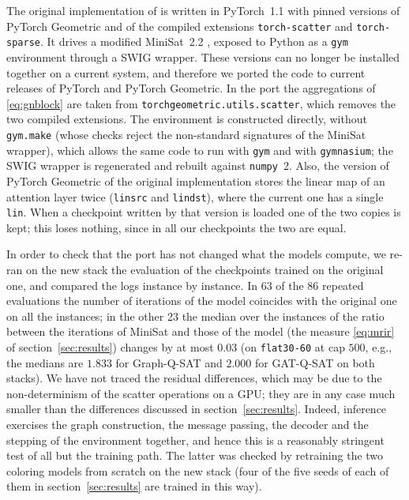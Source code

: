 \documentclass[11pt,a4paper]{article}
\newcommand{\code}[1]{\texttt{\def\_{\textunderscore\allowbreak}#1}}
\begin{document}
The original implementation of \cite{Kurin2020} is written in PyTorch~1.1 with pinned
versions of PyTorch Geometric \cite{FeyLenssen2019} and of the compiled
extensions \code{torch-scatter} and \code{torch-sparse}. It drives a modified
MiniSat~2.2 \cite{EenSorensson2003}, exposed to Python as a \code{gym}
environment through a SWIG wrapper. These versions can no longer be installed
together on a current system, and therefore we ported the code to current
releases of PyTorch and PyTorch Geometric. In the port the aggregations of
\eqref{eq:gnblock} are taken from \code{torch\_geometric.utils.scatter}, which
removes the two compiled extensions. The environment is constructed
directly, without \code{gym.make} (whose checks reject the non-standard
signatures of the MiniSat wrapper), which allows the same code to run with
\code{gym} and with \code{gymnasium}; the SWIG wrapper is regenerated and
rebuilt against \code{numpy}~2. Also, the version of PyTorch Geometric of the original implementation
stores the linear map of an attention layer twice (\code{lin\_src} and
\code{lin\_dst}), where the current one has a single \code{lin}. When a
checkpoint written by that version is loaded one of the two copies is kept; this loses nothing,
since in all our checkpoints the two are equal.

\smallskip
\noindent
In order to check that the port has not changed what the models compute, we
re-ran on the new stack the evaluation of the checkpoints trained on the original one, and compared the logs instance by instance. In 63 of the 86
repeated evaluations the number of iterations of the model coincides with the original one on all the instances; in the other 23 the median over the instances
of the ratio between the iterations of MiniSat and those of the model (the
measure \eqref{eq:mrir} of section~\ref{sec:results}) changes by at most $0.03$
(on \code{flat30-60} at cap $500$,
e.g., the medians are $1.833$ for Graph-Q-SAT and $2.000$ for GAT-Q-SAT on both
stacks). We have not traced the residual differences, which may be due to the
non-determinism of the scatter operations on a GPU; they are in any case much
smaller than the differences discussed in section~\ref{sec:results}. Indeed, inference
exercises the graph construction, the message passing, the decoder and the
stepping of the environment together, and hence this is a reasonably stringent
test of all but the training path. The latter was checked by retraining the two
coloring models from scratch on the new stack (four of the five seeds of each of them in section~\ref{sec:results} are
trained in this way).
\end{document}
